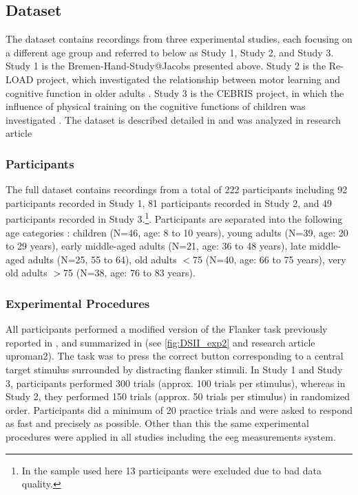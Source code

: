 \subsection{Dataset }
\label{methods:datasets:II}
The  dataset contains recordings from three experimental studies, each focusing on a different age group and referred to below as Study 1, Study 2, and Study 3.\\
Study 1 is the Bremen-Hand-Study@Jacobs presented above. Study 2 is the Re-LOAD project, which investigated the relationship between motor learning and cognitive function in older adults \cite{HUBNER2018104, Hübner2018}. Study 3 is the CEBRIS project, in which the influence of physical training on the cognitive functions of children was investigated \cite{Koutsandreou2016}. The dataset is described detailed in \cite{Reuter2019} and was analyzed in research article 

\subsubsection{Participants}
\label{methods:datasets:II:participants}
The full dataset contains recordings from a total of 222 participants including 92 participants recorded in Study 1, 81 participants recorded in Study 2, and 49 participants recorded in Study 3.\footnote{In the sample used here 13 participants were excluded due to bad data quality.}. Participants are separated into the following age categories \cite{Reuter2019}: children (N=46, age: 8 to 10 years), young adults (N=39, age: 20 to 29 years), early middle-aged adults (N=21, age: 36 to 48 years), late middle-aged adults (N=25, 55 to 64), old adults $<$75 (N=40, age: 66 to 75 years), very old adults $>$75 (N=38, age: 76 to 83 years).

\subsubsection{Experimental Procedures}
\label{methods:datasets:II:experiment}
All participants performed a modified version of the Flanker task previously reported in \cite{Reuter2017, Winneke2012, Winneke2019}, and summarized in \cite{Reuter2019} (see \autoref{fig:DSII_exp2} and research article uproman{2}). The task was to press the correct button corresponding to a central target stimulus surrounded by distracting flanker stimuli. In Study 1 and Study 3, participants performed 300 trials (approx. 100 trials per stimulus), whereas in Study 2, they performed 150 trials (approx. 50 trials per stimulus) in randomized order. Participants did a minimum of 20 practice trials and were asked to respond as fast and precisely as possible. Other than this the same experimental procedures were applied in all studies including the \gls{eeg} measurements system. 

